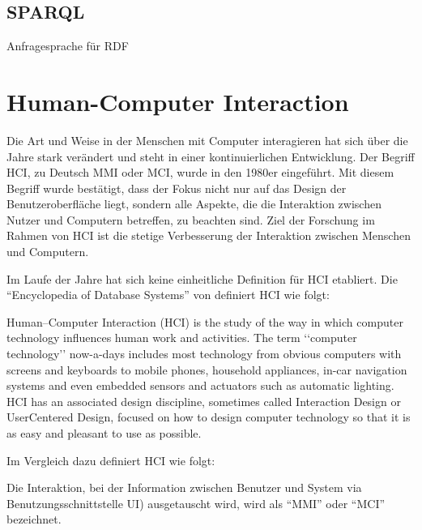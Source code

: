 \subsection{SPARQL} 

Anfragesprache für RDF

\section{Human-Computer Interaction}\label{sec:ux}

Die Art und Weise in der Menschen mit Computer interagieren hat sich über die Jahre stark verändert und steht in einer kontinuierlichen Entwicklung. 
Der Begriff  \ac{HCI}, zu Deutsch \ac{MMI} oder \ac{MCI}, wurde in den 1980er eingeführt.
Mit diesem Begriff wurde bestätigt, dass der Fokus nicht nur auf das Design der Benutzeroberfläche liegt, sondern alle Aspekte, die die Interaktion zwischen Nutzer und Computern betreffen, zu beachten sind. \citep[vgl.]{preece_human-computer_1995}
Ziel der Forschung im Rahmen von \ac{HCI} ist die stetige Verbesserung der Interaktion zwischen Menschen und Computern. \newline

\noindent Im Laufe der Jahre hat sich keine einheitliche Definition für \ac{HCI} etabliert.
Die \enquote{Encyclopedia of Database Systems} von \citet{dix_human-computer_2009} definiert \ac{HCI} wie folgt:
\begin{definition}
  Human–Computer Interaction (HCI) is the study of the way in which computer technology influences human work and activities. 
  The term ‘‘computer technology’’ now-a-days includes most technology from obvious computers with screens and keyboards to mobile phones, household appliances, in-car navigation
  systems and even embedded sensors and actuators such as automatic lighting. 
  HCI has an associated design discipline, sometimes called Interaction Design or UserCentered Design, focused on how to design computer technology so that it is as easy and
  pleasant to use as possible.
\end{definition}

\noindent Im Vergleich dazu definiert \citet{heimgartner_interkulturelles_2017}  \ac{HCI}  wie folgt:

\begin{definition}
  Die Interaktion, bei der Information zwischen Benutzer und System via Benutzungsschnittstelle \ac{UI}) ausgetauscht wird, wird als \enquote{\ac{MMI}}  oder  \enquote{\ac{MCI}} 		 bezeichnet.
\end{definition}

